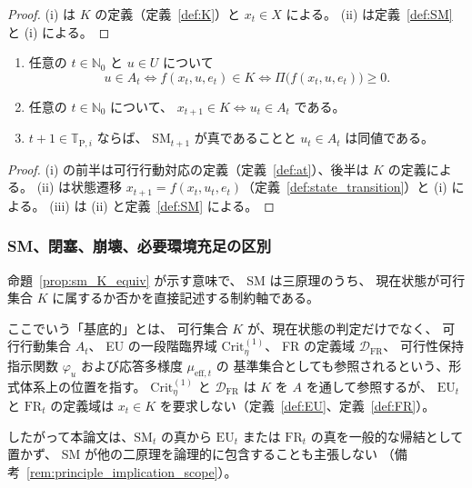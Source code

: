 \begin{proof}
(i) は $K$ の定義（定義~\ref{def:K}）と $x_t\in X$ による。
(ii) は定義~\ref{def:SM} と (i) による。
\end{proof}

\begin{proposition}
\label{prop:sm_one_step_A}
\begin{enumerate}[label=(\roman*)]
  \item 任意の $t\in\mathbb{N}_0$ と $u\in U$ について
  \[
    u\in A_t
    \iff
    f(x_t,u,e_t)\in K
    \iff
    \Pi\bigl(f(x_t,u,e_t)\bigr)\ge0 .
  \]
  \item 任意の $t\in\mathbb{N}_0$ について、
  $x_{t+1}\in K \iff u_t\in A_t$ である。
  \item $t+1\in\mathbb{T}_{\mathrm{P},i}$ ならば、
  $\mathrm{SM}_{t+1}$ が真であることと $u_t\in A_t$ は同値である。
\end{enumerate}
\end{proposition}

\begin{proof}
(i) の前半は可行行動対応の定義（定義~\ref{def:at}）、後半は $K$ の定義による。
(ii) は状態遷移 $x_{t+1}=f(x_t,u_t,e_t)$（定義~\ref{def:state_transition}）と (i) による。
(iii) は (ii) と定義~\ref{def:SM} による。
\end{proof}

\subsubsection{SM、閉塞、崩壊、必要環境充足の区別}

\begin{remark}[SM の基底的位置]
\label{rem:sm_foundational_status}
命題~\ref{prop:sm_K_equiv} が示す意味で、
SM は三原理のうち、
現在状態が可行集合 $K$ に属するか否かを直接記述する制約軸である。

ここでいう「基底的」とは、
可行集合 $K$ が、現在状態の判定だけでなく、
可行行動集合 $A_t$、
EU の一段階臨界域 $\mathrm{Crit}^{(1)}_\eta$、
FR の定義域 $\mathcal{D}_{\mathrm{FR}}$、
可行性保持指示関数 $\varphi_u$ および応答多様度 $\mu_{\mathrm{eff},t}$ の
基準集合としても参照されるという、形式体系上の位置を指す。
$\mathrm{Crit}^{(1)}_\eta$ と $\mathcal{D}_{\mathrm{FR}}$ は $K$ を $A$ を通して参照するが、
$\mathrm{EU}_t$ と $\mathrm{FR}_t$ の定義域は $x_t\in K$ を要求しない（定義~\ref{def:EU}、定義~\ref{def:FR}）。

したがって本論文は、$\mathrm{SM}_t$ の真から
$\mathrm{EU}_t$ または $\mathrm{FR}_t$ の真を一般的な帰結として置かず、
SM が他の二原理を論理的に包含することも主張しない
（備考~\ref{rem:principle_implication_scope}）。
\end{remark}

